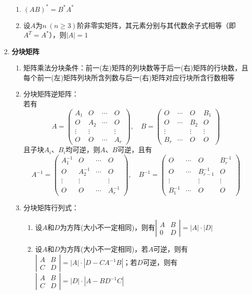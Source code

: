 \documentclass[12pt,a4paper,UTF8]{book}
\begin{document}
\begin{enumerate}
\begin{enumerate}
\item $\left(AB\right)^*=B^*A^*$
\item 设$A$为$n\ (n\geq3)$阶非零实矩阵，其元素分别与其代数余子式相等（即$A^T=A^*$），则$\left|A\right|=1$
\end{enumerate}
\item \textbf{分块矩阵}
\begin{enumerate}
\item 矩阵乘法分块条件：前一(左)矩阵的列块数等于后一(右)矩阵的行块数，且每个前一(左)矩阵列块所含列数与后一(右)矩阵对应行块所含行数相等
\item 分块矩阵逆矩阵：\\
若有
\[A=\begin{pmatrix}A_1&O&\cdots&O\\O&A_2&\cdots&O\\\vdots&\vdots&\quad&\vdots\\O&O&\cdots&A_r\end{pmatrix},\quad B=\begin{pmatrix}O&\cdots&O&B_1\\O&\cdots&B_2&O\\\vdots&\quad&\vdots&\vdots\\B_r&\cdots&O&O\end{pmatrix}\]
且子块$A_i$、$B_i$均可逆，则$A$、$B$可逆，且有
\[A^{-1}=\begin{pmatrix}A_1^{-1}&O&\cdots&O\\O&A_2^{-1}&\cdots&O\\\vdots&\vdots&\quad&\vdots\\O&O&\cdots&A_r^{-1}\end{pmatrix},\quad B^{-1}=\begin{pmatrix}O&\cdots&O&B_r^{-1}\\O&\cdots&B_{r-1}^{-1}&O\\\vdots&\quad&\vdots&\vdots\\B_1^{-1}&\cdots&O&O\end{pmatrix}\]
\item 分块矩阵行列式：
\begin{enumerate}
\item 设$A$和$D$为方阵(大小不一定相同)，则有$\left|\begin{array}{cc}A&B\\0&D\end{array}\right|=\left|A\right|\cdot\left|D\right|$
\item 设$A$和$D$为方阵(大小不一定相同)，若$A$可逆，则有$\left|\begin{array}{cc}A&B\\C&D\end{array}\right|=\left|A\right|\cdot\left|D-CA^{-1}B\right|$；若$D$可逆，则有$\left|\begin{array}{cc}A&B\\C&D\end{array}\right|=\left|D\right|\cdot\left|A-BD^{-1}C\right|$

\end{enumerate}
\end{enumerate}
\end{enumerate}
\end{document}
